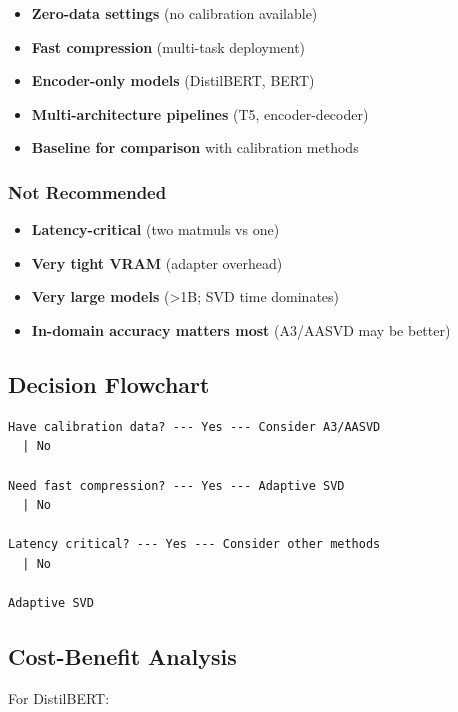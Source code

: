 \begin{itemize}
\item \textbf{Zero-data settings} (no calibration available)
\item \textbf{Fast compression} (multi-task deployment)
\item \textbf{Encoder-only models} (DistilBERT, BERT)
\item \textbf{Multi-architecture pipelines} (T5, encoder-decoder)
\item \textbf{Baseline for comparison} with calibration methods

\end{itemize}
\subsubsection{Not Recommended}

\begin{itemize}
\item \textbf{Latency-critical} (two matmuls vs one)
\item \textbf{Very tight VRAM} (adapter overhead)
\item \textbf{Very large models} (\textgreater{}1B; SVD time dominates)
\item \textbf{In-domain accuracy matters most} (A3/AASVD may be better)

\end{itemize}
\subsection{Decision Flowchart}

\begin{lstlisting}
Have calibration data? --- Yes --- Consider A3/AASVD
  | No
   
Need fast compression? --- Yes --- Adaptive SVD
  | No
   
Latency critical? --- Yes --- Consider other methods
  | No
   
Adaptive SVD
\end{lstlisting}

\subsection{Cost-Benefit Analysis}

For DistilBERT:

